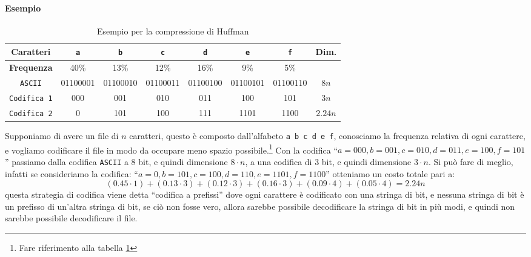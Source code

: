         \paragraph{Esempio} 
        \begin{table}
            \centering
            \begin{tabular}{|c|c|c|c|c|c|c|c|}
                \hline \textbf{Caratteri} & \texttt{a} & \texttt{b} & \texttt{c} & \texttt{d} & \texttt{e} & \texttt{f} & \textbf{Dim.}\\
                \hline
                \textbf{Frequenza} & 40\% & 13\% & 12\% & 16\% & 9\% & 5\% & \\
                \hline
                \texttt{ASCII} & 01100001 & 01100010 & 01100011 & 01100100 & 01100101 & 01100110 & $8n$\\
                \hline
                \texttt{Codifica 1} & 000 & 001 & 010 & 011 & 100 & 101 & $3n$\\
                \hline
                \texttt{Codifica 2} & 0 & 101 & 100 & 111 & 1101 & 1100 & $2.24n$\\
                \hline
            \end{tabular}
            \caption{Esempio per la compressione di Huffman}
            \label{tab:huffman}
        \end{table}
        Supponiamo di avere un file di $n$ caratteri, questo è composto dall'alfabeto \texttt{a b c d e f}, conosciamo la frequenza relativa di ogni carattere, e vogliamo codificare il file in modo da occupare meno spazio possibile.\footnote{Fare riferimento alla tabella \ref{tab:huffman}}\newline
        Con la codifica ``$a=000, b=001, c=010, d=011, e=100, f=101$'' passiamo dalla codifica \texttt{ASCII} a $8$ bit, e quindi dimensione $8\cdot n$, a una codifica di $3$ bit, e quindi dimensione $3\cdot n$.\newline
        Si può fare di meglio, infatti se consideriamo la codifica: ``$a=0, b=101, c=100, d=110, e=1101, f=1100$'' otteniamo un costo totale pari a:
        $$
            (0.45\cdot 1) + (0.13\cdot 3) + (0.12\cdot 3) + (0.16\cdot 3) + (0.09\cdot 4) + (0.05\cdot 4) = 2.24n
        $$
        questa strategia di codifica viene detta ``codifica a prefissi'' dove ogni carattere è codificato con una stringa di bit, e nessuna stringa di bit è un prefisso di un'altra stringa di bit, se ciò non fosse vero, allora sarebbe possibile decodificare la stringa di bit in più modi, e quindi non sarebbe possibile decodificare il file.
